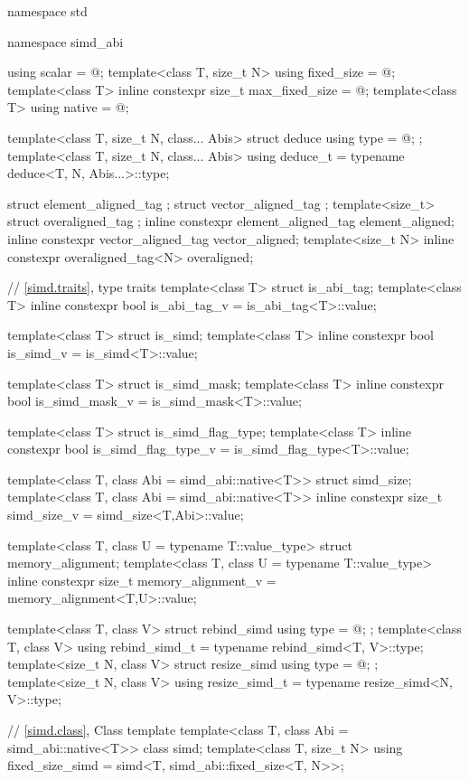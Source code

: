 \begin{codeblock}
namespace std {
  namespace simd_abi {
    using scalar = @\seebelow@;
    template<class T, size_t N> using fixed_size = @\seebelow@;
    template<class T> inline constexpr size_t max_fixed_size = @\impdef@;
    template<class T> using native = @\impdef@;

    template<class T, size_t N, class... Abis> struct deduce { using type = @\seebelow@; };
    template<class T, size_t N, class... Abis> using deduce_t =
      typename deduce<T, N, Abis...>::type;
  }

  struct element_aligned_tag {};
  struct vector_aligned_tag {};
  template<size_t> struct overaligned_tag {};
  inline constexpr element_aligned_tag element_aligned{};
  inline constexpr vector_aligned_tag vector_aligned{};
  template<size_t N> inline constexpr overaligned_tag<N> overaligned{};

  // \ref{simd.traits},  type traits
  template<class T> struct is_abi_tag;
  template<class T> inline constexpr bool is_abi_tag_v = is_abi_tag<T>::value;

  template<class T> struct is_simd;
  template<class T> inline constexpr bool is_simd_v = is_simd<T>::value;

  template<class T> struct is_simd_mask;
  template<class T> inline constexpr bool is_simd_mask_v = is_simd_mask<T>::value;

  template<class T> struct is_simd_flag_type;
  template<class T> inline constexpr bool is_simd_flag_type_v =
    is_simd_flag_type<T>::value;

  template<class T, class Abi = simd_abi::native<T>> struct simd_size;
  template<class T, class Abi = simd_abi::native<T>>
    inline constexpr size_t simd_size_v = simd_size<T,Abi>::value;

  template<class T, class U = typename T::value_type> struct memory_alignment;
  template<class T, class U = typename T::value_type>
    inline constexpr size_t memory_alignment_v = memory_alignment<T,U>::value;

  template<class T, class V> struct rebind_simd { using type = @\seebelow@; };
  template<class T, class V> using rebind_simd_t = typename rebind_simd<T, V>::type;
  template<size_t N, class V> struct resize_simd { using type = @\seebelow@; };
  template<size_t N, class V> using resize_simd_t = typename resize_simd<N, V>::type;

  // \ref{simd.class}, Class template 
  template<class T, class Abi = simd_abi::native<T>> class simd;
  template<class T, size_t N> using fixed_size_simd = simd<T, simd_abi::fixed_size<T, N>>;

}
\end{codeblock}
